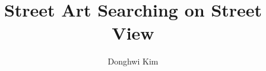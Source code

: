 \documentclass{sig-alternate-10pt}
\begin{document}
\newcommand{\note}[1]{[\textcolor{red}{\textit{#1}}]}
\newcommand{\eat}[1]{}

\newcommand{\name}{AAA}

\newcommand{\oursection}[1]{\vspace{-.0in}\section{#1}\vspace{-.0in}}
\newcommand{\oursubsection}[1]{\vspace{-.0in}\subsection{#1}\vspace{-.0in}}
\newcommand{\oursubsubsection}[1]{\vspace{-.0in}\subsubsection{#1}\vspace{-.0in}}
\newcommand{\ourcaption}[1]{\vspace{-.0in}\caption{\small #1}\vspace{-0.0in}}


\title{Street Art Searching on Street View}

\author{\rm{Donghwi Kim}}

\maketitle

%










\end{document}
